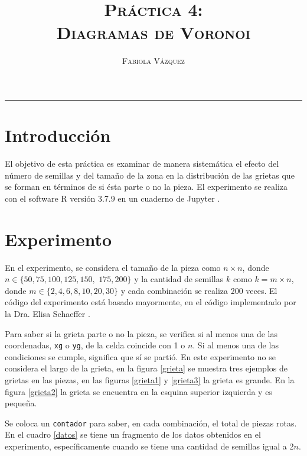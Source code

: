 \documentclass[12pt,letterpaper]{article}
\title{\textsc{Práctica 4: \\ Diagramas de Voronoi}}
\author{\textsc{Fabiola Vázquez}}
\begin{document}
\maketitle

\hrule
\section{Introducción}
El objetivo de esta práctica \cite{elisapractica4} es examinar de manera sistemática el efecto del número de semillas y del tamaño de la zona en la distribución de las grietas que se forman en términos de si ésta parte o no la pieza. El  experimento se realiza con el software R versión 3.7.9 \cite{R} en un cuaderno de Jupyter \cite{jupyter}.

\section{Experimento}
En el experimento, se considera el tamaño de la pieza como $n\times n$, donde $n \in \lbrace 50, 75, 100, 125, 150,$ $ 175, 200\rbrace$ y la cantidad de semillas $k$ como $k=m\times n$, donde $m \in \{2, 4, 6, 8, 10, 20, 30\}$ y cada combinación se realiza 200 veces. El código del experimento está basado mayormente, en el código implementado por la Dra. Elisa Schaeffer \cite{codigoelisapractica4}. 

Para saber si la grieta parte o no la pieza, se verifica si al menos una de las coordenadas, \texttt{xg} o \texttt{yg}, de la celda coincide con 1 o $n$. Si al menos una de las condiciones se cumple, significa que sí se partió. En este experimento no se considera el largo de la grieta, en la figura \ref{grieta} se muestra tres ejemplos de grietas en las piezas, en las figuras \ref{grieta1} y \ref{grieta3} la grieta es grande. En la figura \ref{grieta2} la grieta se encuentra en la esquina superior izquierda y es pequeña. 

Se coloca un \texttt{contador} para saber, en cada combinación, el total de piezas rotas. En el cuadro \ref{datos} se tiene un fragmento de los datos obtenidos en el experimento, específicamente cuando se tiene una cantidad de semillas igual a 2$n$.
\end{document}
